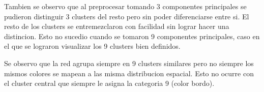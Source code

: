 Tambien se observo que al preprocesar tomando 3 componentes principales se pudieron distinguir 3 clusters del resto pero
sin poder diferenciarse entre si. El resto de los clusters se entremezclaron con facilidad sin lograr hacer una distincion.
Esto no sucedio cuando se tomaron 9 componentes principales, caso en el que se lograron visualizar los 9 clusters bien definidos.

Se observo que la red agrupa siempre en 9 clusters similares pero no siempre los mismos colores se mapean a las misma
distribucion espacial. Esto no ocurre con el cluster central que siempre le asigna la categoria 9 (color bordo).
